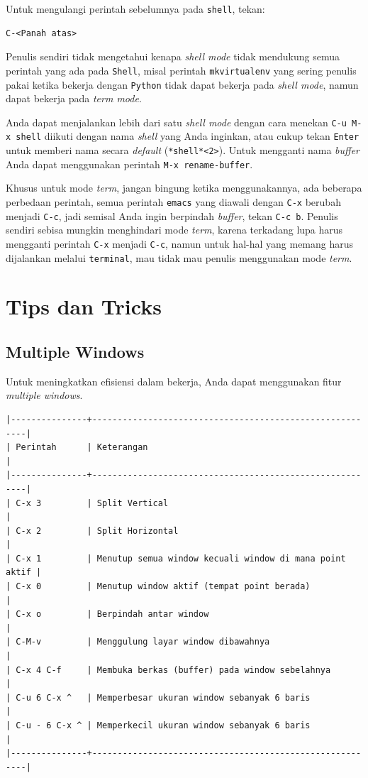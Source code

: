 \documentclass{article}
\begin{document}
Untuk mengulangi perintah sebelumnya pada \verb=shell=, tekan:

\begin{verbatim}
C-<Panah atas>
\end{verbatim}

Penulis sendiri tidak mengetahui kenapa \emph{shell mode} tidak mendukung
semua perintah yang ada pada \verb=Shell=, misal perintah \verb=mkvirtualenv=
yang sering penulis pakai ketika bekerja dengan \verb=Python= tidak dapat 
bekerja pada \emph{shell mode}, namun dapat bekerja pada \emph{term mode}.

Anda dapat menjalankan lebih dari satu \emph{shell mode} dengan cara 
menekan \verb=C-u M-x shell= diikuti dengan nama \emph{shell} yang Anda 
inginkan, atau cukup tekan \verb=Enter= untuk memberi nama secara 
\emph{default} (\verb=*shell*<2>=). Untuk mengganti nama \emph{buffer}
Anda dapat menggunakan perintah \verb=M-x rename-buffer=.

Khusus untuk mode \emph{term}, jangan bingung ketika menggunakannya, ada
beberapa perbedaan perintah, semua perintah \verb=emacs= yang diawali dengan
\verb=C-x= berubah menjadi \verb=C-c=, jadi semisal Anda ingin berpindah
\emph{buffer}, tekan \verb=C-c b=. Penulis sendiri sebisa mungkin menghindari
mode \emph{term}, karena terkadang lupa harus mengganti perintah \verb=C-x=
menjadi \verb=C-c=, namun untuk hal-hal yang memang harus dijalankan melalui
\verb=terminal=, mau tidak mau penulis menggunakan mode \emph{term}.

\section{Tips dan Tricks}

\subsection{Multiple Windows}
Untuk meningkatkan efisiensi dalam bekerja, Anda dapat menggunakan fitur
\emph{multiple windows}.

\begin{verbatim}
|---------------+---------------------------------------------------------|
| Perintah      | Keterangan                                              |
|---------------+---------------------------------------------------------|
| C-x 3         | Split Vertical                                          |
| C-x 2         | Split Horizontal                                        |
| C-x 1         | Menutup semua window kecuali window di mana point aktif |
| C-x 0         | Menutup window aktif (tempat point berada)              |
| C-x o         | Berpindah antar window                                  |
| C-M-v         | Menggulung layar window dibawahnya                      |
| C-x 4 C-f     | Membuka berkas (buffer) pada window sebelahnya          |
| C-u 6 C-x ^   | Memperbesar ukuran window sebanyak 6 baris              |
| C-u - 6 C-x ^ | Memperkecil ukuran window sebanyak 6 baris              |
|---------------+---------------------------------------------------------|
\end{verbatim}
\end{document}
